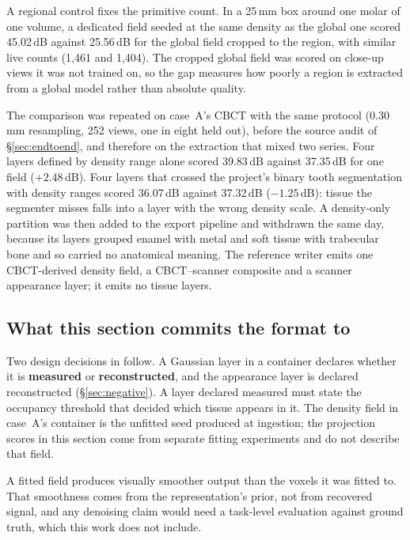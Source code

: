 \documentclass[11pt,a4paper]{article}
\newenvironment{finding}[1]
 {\par\medskip\noindent{\color{uosblue}\rule{\linewidth}{0.9pt}}\par\nobreak\vspace{3pt}
  \noindent{\bfseries\color{uosblue}#1}\par\nobreak\vspace{2pt}}
 {\par\vspace{2pt}\noindent{\color{uosrule}\rule{\linewidth}{0.6pt}}\par\medskip}
\begin{document}
A regional control fixes the primitive count. In a 25\,mm box around one molar of one volume, a
dedicated field seeded at the same density as the global one scored 45.02\,dB against
25.56\,dB for the global field cropped to the region, with similar live counts (1{,}461 and
1{,}404). The cropped global field was scored on close-up views it was not trained on, so
the gap measures how poorly a region is extracted from a global model rather than absolute
quality.

\begin{finding}{The layer gain did not transfer to case~A}
The comparison was repeated on case~A's CBCT with the same protocol (0.30\,mm resampling,
252 views, one in eight held out), before the source audit of \S\ref{sec:endtoend}, and
therefore on the extraction that mixed two series. Four layers defined by density range
alone scored 39.83\,dB against 37.35\,dB for one field ($+2.48$\,dB). Four layers that
crossed the project's binary tooth segmentation with density ranges scored 36.07\,dB against
37.32\,dB ($-1.25$\,dB): tissue the segmenter misses falls into a layer with the wrong
density scale. A density-only partition was then added to the export pipeline and
withdrawn the same day, because its layers grouped enamel with metal and soft tissue with
trabecular bone and so carried no anatomical meaning. The reference writer emits one
CBCT-derived density field, a CBCT--scanner composite and a scanner appearance layer; it
emits no tissue layers.
\end{finding}

\subsection{What this section commits the format to}

Two design decisions in \cite{uosspec} follow. A Gaussian layer in a container declares
whether it is \textbf{measured} or \textbf{reconstructed}, and the appearance layer is
declared reconstructed (\S\ref{sec:negative}). A layer declared measured must state the
occupancy threshold that decided which tissue appears in it. The density field in case~A's
container is the unfitted seed produced at ingestion; the projection scores in this section
come from separate fitting experiments and do not describe that field.

A fitted field produces visually smoother output than the voxels it was fitted to. That
smoothness comes from the representation's prior, not from recovered signal, and any
denoising claim would need a task-level evaluation against ground truth, which this work
does not include.
\end{document}
